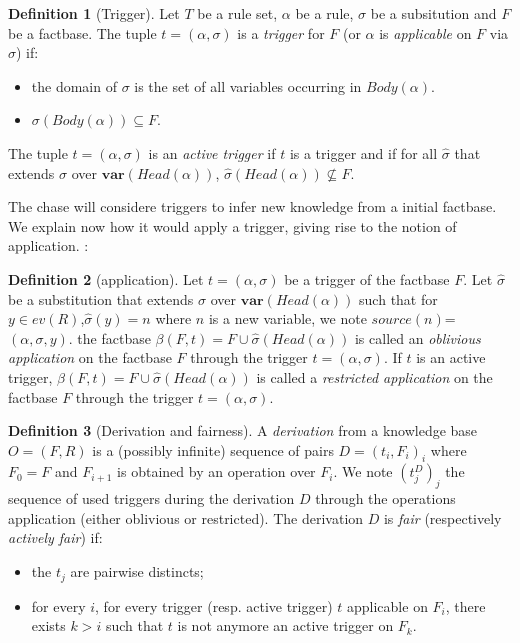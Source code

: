 \documentclass{article}
\theoremstyle{definition}
\newtheorem{definition}{Definition}[section]
\theoremstyle{remark}
\begin{document}
\begin{definition}[Trigger]
Let $T$ be a rule set, $\alpha$ be a rule, $\sigma$ be a subsitution and $F$ be a factbase. The tuple $t = (\alpha,\sigma)$ is a \emph{trigger} for $F$ (or $\alpha$ is \emph{applicable} on $F$ via $\sigma$) if: 
\begin{itemize}
\item the domain of $\sigma$ is the set of all variables occurring in $Body(\alpha)$.
\item $\sigma(Body(\alpha)) \subseteq F$.
\end{itemize}
The tuple $t = (\alpha,\sigma)$ is an \emph{active trigger} if $t$ is a trigger and if for all $\hat \sigma$ that extends $\sigma$ over $\textbf{var}(\textit{Head}(\alpha))$, $\hat \sigma(Head(\alpha)) \nsubseteq F$.

\end{definition} 

The chase will considere triggers to infer new knowledge from a initial factbase. We explain now how it would apply a trigger, giving rise to the notion of application. :

\begin{definition}[application]
Let $t = (\alpha,\sigma)$ be a trigger of the factbase $F$. Let $\hat \sigma$ be a substitution that extends $\sigma$ over $\textbf{var}(\textit{Head}(\alpha))$ such that for $y \in \textit{ev}(R)$,$\hat \sigma(y) = n$ where $n$ is a new variable, we note \emph{$\textit{source}(n)$}= $(\alpha,\sigma,y)$.
the factbase $\beta(F,t)=F \cup \hat \sigma(\textit{Head}(\alpha))$ is called an \emph{oblivious application} on the factbase $F$ through the trigger $t = (\alpha,\sigma)$. If $t$ is an active trigger, $\beta(F,t)=F \cup \hat \sigma(\textit{Head}(\alpha))$ is called a \emph{restricted application} on the factbase $F$ through the trigger $t = (\alpha,\sigma)$.
\end{definition}

\begin{definition}[Derivation and fairness]
A \emph{derivation} from a knowledge base $O= (F,R)$ is a (possibly infinite) sequence of pairs $D = (t_i,F_i)_{i}$ where $F_0 = F$ and $F_{i+1}$ is obtained by an operation over $F_i$. We note $(t^D_j)_j$ the sequence of used triggers during the derivation $D$ through the operations application (either oblivious or restricted). The derivation $D$ is \emph{fair} (respectively \emph{actively fair}) if:
\begin{itemize}
\item the $t_j$ are pairwise distincts;
\item for every $i$, for every trigger (resp. active trigger) $t$ applicable on $F_i$, there exists $k > i$ such that $t$ is not anymore an active trigger on $F_k$.
\end{itemize}
\end{definition}
\end{document}
